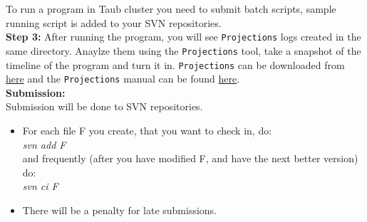 \documentclass{article}
\begin{document}
    To run a program in Taub cluster you need to submit batch scripts, sample
    running script is added to your SVN repositories.  \\

\textbf{Step 3:}  After running the program, you will see \texttt{Projections}
logs created in the same directory. Anaylze them using the \texttt{Projections} tool, take a snapshot of the timeline of the program and turn it in. \texttt{Projections} can be
downloaded from \href{http://charm.cs.uiuc.edu/software}{here} and the
\texttt{Projections} manual can
be found
\href{http://charm.cs.illinois.edu/manuals/html/projections/manual-1p.html}
{here}. \\

\textbf{Submission:} \\
Submission will be done to SVN repositories.
\begin{itemize}
\item  For each file F you create, that you want to check in, do: \\
        \textit{svn add F}\\
        and frequently (after you have modified F, and have the next better
        version) do:\\ 
        \textit{svn ci F}
\item  There will be a penalty for late submissions.
\end{itemize}
\end{document}
